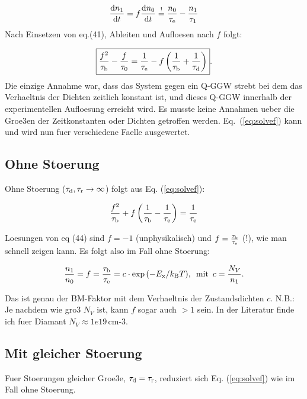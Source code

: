 \begin{equation}
 \frac{\mathrm d n_1}{\mathrm d t} = f \frac{\mathrm d n_0}{\mathrm d t} \stackrel{!}{=} \frac{n_0}{\tau_\textrm{e}} - \frac{n_1}{\tau_{1}}
\end{equation}
\noindent
Nach Einsetzen von eq.(41), Ableiten und Aufloesen nach $f$ folgt:

\begin{equation}
 \boxed{\frac{f^2}{\tau_{\textrm{b}}} - \frac{f}{\tau_{0}} = \frac{1}{\tau_\textrm{e}} - f \left( \frac{1}{\tau_{\textrm{b}}} + \frac{1}{\tau_{\textrm{d}}} \right)}.
 \label{eq:solvef}
\end{equation}
\noindent
Die einzige Annahme war, dass das System gegen ein Q-GGW strebt bei dem das Verhaeltnis der Dichten zeitlich konstant ist,
 und dieses Q-GGW innerhalb der experimentellen Aufloesung erreicht wird. 
Es musste keine Annahmen ueber die Groe3en der Zeitkonstanten oder Dichten getroffen werden. 
Eq.~(\ref{eq:solvef}) kann und wird nun fuer verschiedene Faelle ausgewertet. 

\subsection{Ohne Stoerung}

Ohne Stoerung ($\tau_{\textrm{d}},\tau_\textrm{r} \rightarrow \infty$) folgt aus Eq. (\ref{eq:solvef}):

\begin{equation}
 \frac{f^2}{\tau_{\textrm{b}}} + f\left( \frac{1}{\tau_{\textrm{b}}} - \frac{1}{\tau_\textrm{e}} \right) = \frac{1}{\tau_\textrm{e}} 
\end{equation}

Loesungen von eq (44) sind $f = -1$ (unphysikalisch) und $f = \frac{\tau_{\textrm{b}}}{\tau_\textrm{e}}$ (!), wie man schnell zeigen kann. Es folgt also im Fall ohne Stoerung:

\begin{equation}
 \frac{n_1}{n_0} = f = \frac{\tau_{\textrm{b}}}{\tau_\textrm{e}} = c \cdot \exp{\left(-E_{\textrm{x}}/k_{\textrm{B}}T \right)}, \,\,\,\textrm{mit}\,\,\, c = \frac{N_V}{n_1}.
\end{equation}

\noindent
Das ist genau der BM-Faktor mit dem Verhaeltnis der Zustandsdichten $c$. 
N.B.: Je nachdem wie gro3 $N_V$ ist, kann $f$ sogar auch $>1$ sein.
In der Literatur finde ich fuer Diamant $N_V \approx 1e19$\,cm-3.

\subsection{Mit gleicher Stoerung}
Fuer Stoerungen gleicher Groe3e, $\tau_{\textrm{d}} = \tau_\textrm{r}$, reduziert sich Eq. (\ref{eq:solvef}) wie im Fall ohne Stoerung.


